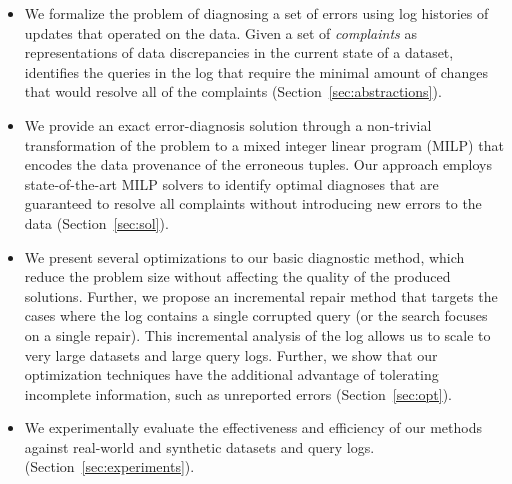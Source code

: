 \begin{itemize}[leftmargin=*, topsep=0mm, itemsep=0mm]      
    \item We formalize the problem of diagnosing a set of errors using log
    histories of updates that operated on the data. Given a set of 
    \emph{complaints} as representations of data discrepancies in the current
    state of a dataset, \sys identifies the queries in the log that require the  minimal
    amount of changes that would resolve all of the complaints (Section~\ref{sec:abstractions}).
      
    \item We provide an exact error-diagnosis solution through a non-trivial
    transformation of the problem to a mixed integer linear program (MILP) that
    encodes the data provenance of the erroneous tuples. Our approach employs state-of-the-art MILP solvers to identify
    optimal diagnoses that are guaranteed to resolve all complaints without introducing new errors to the data
    (Section~\ref{sec:sol}).
    
    \item We present several optimizations to our basic diagnostic
    method, which reduce the problem size without affecting the
    quality of the produced solutions. Further, we propose an
    incremental repair method that targets the cases where the log
    contains a single corrupted query (or the search focuses on a
    single repair). This incremental analysis of the log allows us to
    scale to very large datasets and large query logs. Further, we
    show that our optimization techniques have the additional
    advantage of tolerating incomplete information, such as unreported
    errors (Section~\ref{sec:opt}).

    
    
    \item We experimentally evaluate the effectiveness and efficiency of our
    methods against real-world and synthetic datasets and query logs. 
    (Section~\ref{sec:experiments}). 
\end{itemize}



